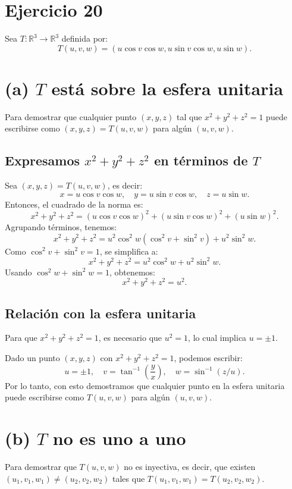 \documentclass[12pt]{article}
\begin{document}
	
	\section*{Ejercicio 20}
	
	Sea \( T : \mathbb{R}^3 \to \mathbb{R}^3 \) definida por:
	\[
	T(u, v, w) = (u \cos v \cos w, u \sin v \cos w, u \sin w).
	\]
	
	\section*{(a) \( T \) está sobre la esfera unitaria}
	Para demostrar que cualquier punto \( (x, y, z) \) tal que \( x^2 + y^2 + z^2 = 1 \) puede escribirse como \( (x, y, z) = T(u, v, w) \) para algún \( (u, v, w) \).
	
	\subsection*{Expresamos \( x^2 + y^2 + z^2 \) en términos de \( T \)}
	Sea \( (x, y, z) = T(u, v, w) \), es decir:
	\[
	x = u \cos v \cos w, \quad y = u \sin v \cos w, \quad z = u \sin w.
	\]
	Entonces, el cuadrado de la norma es:
	\[
	x^2 + y^2 + z^2 = (u \cos v \cos w)^2 + (u \sin v \cos w)^2 + (u \sin w)^2.
	\]
	Agrupando términos, tenemos:
	\[
	x^2 + y^2 + z^2 = u^2 \cos^2 w (\cos^2 v + \sin^2 v) + u^2 \sin^2 w.
	\]
	Como \( \cos^2 v + \sin^2 v = 1 \), se simplifica a:
	\[
	x^2 + y^2 + z^2 = u^2 \cos^2 w + u^2 \sin^2 w.
	\]
	Usando \( \cos^2 w + \sin^2 w = 1 \), obtenemos:
	\[
	x^2 + y^2 + z^2 = u^2.
	\]
	
	\subsection*{Relación con la esfera unitaria}
	Para que \( x^2 + y^2 + z^2 = 1 \), es necesario que \( u^2 = 1 \), lo cual implica \( u = \pm 1 \). 
	
	Dado un punto \( (x, y, z) \) con \( x^2 + y^2 + z^2 = 1 \), podemos escribir:
	\[
	u = \pm 1, \quad v = \tan^{-1}\left(\frac{y}{x}\right), \quad w = \sin^{-1}(z/u).
	\]
	Por lo tanto, con esto demostramos que cualquier punto en la esfera unitaria puede escribirse como \( T(u, v, w) \) para algún \( (u, v, w) \).
	
	\section*{(b) \( T \) no es uno a uno}
	Para demostrar que \( T(u, v, w) \) no es inyectiva, es decir, que existen \( (u_1, v_1, w_1) \neq (u_2, v_2, w_2) \) tales que \( T(u_1, v_1, w_1) = T(u_2, v_2, w_2) \).
	
\end{document}
